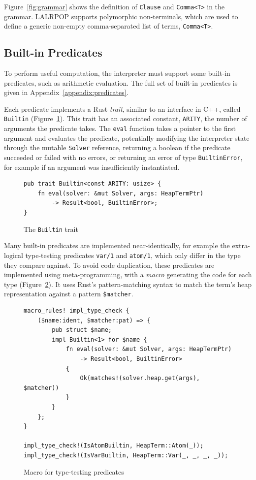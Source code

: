 Figure~\ref{fig:grammar} shows the definition of \texttt{Clause} and \texttt{Comma<T>} in the grammar. LALRPOP supports polymorphic non-terminals, which are used to define a generic non-empty comma-separated list of terms, \texttt{Comma<T>}.

\subsection{Built-in Predicates}

\label{sec:builtins}

To perform useful computation, the interpreter must support some built-in predicates, such as arithmetic evaluation. The full set of built-in predicates is given in Appendix~\ref{appendix:predicates}.

Each predicate implements a Rust \emph{trait}, similar to an interface in C++, called \texttt{Builtin} (Figure~\ref{fig:builtin-trait}). This trait has an associated constant, \texttt{ARITY}, the number of arguments the predicate takes. The \texttt{eval} function takes a pointer to the first argument and evaluates the predicate, potentially modifying the interpreter state through the mutable \texttt{Solver} reference, returning a boolean if the predicate succeeded or failed with no errors, or returning an error of type \texttt{BuiltinError}, for example if an argument was insufficiently instantiated.

\begin{figure}[H]
\centering
\begin{verbatim}
pub trait Builtin<const ARITY: usize> {
    fn eval(solver: &mut Solver, args: HeapTermPtr)
        -> Result<bool, BuiltinError>;
}
\end{verbatim}
\caption{The \texttt{Builtin} trait}
\label{fig:builtin-trait}
\end{figure}

Many built-in predicates are implemented near-identically, for example the extra-logical type-testing predicates \texttt{var/1} and \texttt{atom/1}, which only differ in the type they compare against. To avoid code duplication, these predicates are implemented using meta-programming, with a \emph{macro} generating the code for each type (Figure~\ref{fig:builtin-macro}). It uses Rust's pattern-matching syntax to match the term's heap representation against a pattern \texttt{\$matcher}.

\begin{figure}[H]
\centering
\begin{verbatim}
macro_rules! impl_type_check {
    ($name:ident, $matcher:pat) => {
        pub struct $name;
        impl Builtin<1> for $name {
            fn eval(solver: &mut Solver, args: HeapTermPtr)
                -> Result<bool, BuiltinError>
            {
                Ok(matches!(solver.heap.get(args), $matcher))
            }
        }
    };
}

impl_type_check!(IsAtomBuiltin, HeapTerm::Atom(_));
impl_type_check!(IsVarBuiltin, HeapTerm::Var(_, _, _, _));
\end{verbatim}
\caption{Macro for type-testing predicates}
\label{fig:builtin-macro}
\end{figure}

